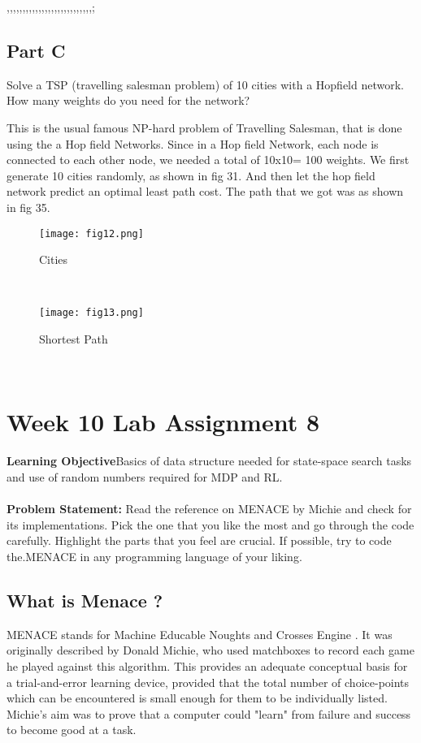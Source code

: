 ,,,,,,,,,,,,,,,,,,,,,,,,,,,;\documentclass[conference]{IEEEtran}
\begin{document}
\subsection{Part C}
\par Solve a TSP (travelling salesman problem) of 10 cities with
a Hopfield network. How many weights do you need for the
network?
\par  This is the usual famous NP-hard problem of Travelling
Salesman, that is done using the a Hop field Networks.
Since in a Hop field Network, each node is connected to
each other node, we needed a total of 10x10= 100 weights.
We first generate 10 cities randomly, as shown in fig 31.
And then let the hop field network predict an optimal least
path cost.
The path that we got was as shown in fig 35.
\\
\begin{figure}[htbp]
\centerline{\texttt{[image: fig12.png]}}
\caption{Cities}
\label{figure}
\end{figure}
\\
\begin{figure}[htbp]
\centerline{\texttt{[image: fig13.png]}}
\caption{Shortest Path}
\label{figure}
\end{figure}
\\
\section{Week 10 Lab Assignment 8}
\textbf{Learning Objective}Basics of data structure needed for state-space search tasks and use of random numbers required
for MDP and RL.
\\
\\
\textbf{ Problem Statement: }
Read the reference on MENACE by Michie and check for its implementations. Pick the one that  you like the most and go through the code carefully. Highlight the parts that you feel are crucial. If possible, try to code the.MENACE in any programming language of your liking.
\\
\subsection{ What is Menace ?}
\par  MENACE stands for Machine Educable Noughts and
Crosses Engine \cite{b17}. It was originally described by Donald
Michie, who used matchboxes to record each game he played
against this algorithm. This provides an adequate conceptual
basis for a trial-and-error learning device, provided that the
total number of choice-points which can be encountered is
small enough for them to be individually listed. Michie's aim
was to prove that a computer could "learn" from failure and
success to become good at a task.
\\
\end{document}
